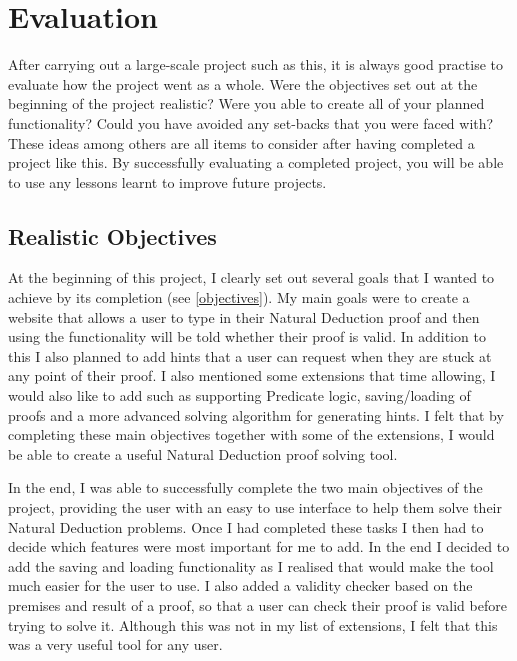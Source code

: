 \pagebreak

\section{Evaluation}

After carrying out a large-scale project such as this, it is always good practise to evaluate how the project went as a whole. Were the objectives set out at the beginning of the project realistic? Were you able to create all of your planned functionality? Could you have avoided any set-backs that you were faced with? These ideas among others are all items to consider after having completed a project like this. By successfully evaluating a completed project, you will be able to use any lessons learnt to improve future projects.

\subsection{Realistic Objectives}

At the beginning of this project, I clearly set out several goals that I wanted to achieve by its completion (see \ref{objectives}). My main goals were to create a website that allows a user to type in their Natural Deduction proof and then using the functionality will be told whether their proof is valid. In addition to this I also planned to add hints that a user can request when they are stuck at any point of their proof. I also mentioned some extensions that time allowing, I would also like to add such as supporting Predicate logic, saving/loading of proofs and a more advanced solving algorithm for generating hints. I felt that by completing these main objectives together with some of the extensions, I would be able to create a useful Natural Deduction proof solving tool.

In the end, I was able to successfully complete the two main objectives of the project, providing the user with an easy to use interface to help them solve their Natural Deduction problems. Once I had completed these tasks I then had to decide which features were most important for me to add. In the end I decided to add the saving and loading functionality as I realised that would make the tool much easier for the user to use. I also added a validity checker based on the premises and result of a proof, so that a user can check their proof is valid before trying to solve it. Although this was not in my list of extensions, I felt that this was a very useful tool for any user. 

